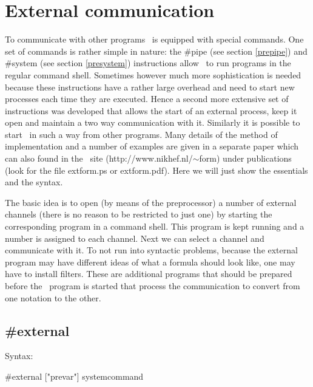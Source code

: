 \chapter{External communication}
\label{externalcommunication}

To communicate with other programs \FORM\ is 
equipped with special commands. One set of commands is rather simple in 
nature: the \#pipe (see section \ref{prepipe}) and 
\#system (see section \ref{presystem}) instructions allow 
\FORM\ to run programs in the regular command 
shell. Sometimes however much more sophistication is needed 
because these instructions have a rather large overhead and need to start 
new processes each time they are executed. Hence a second more extensive 
set of instructions was developed that allows the start of an external 
process, keep it open and maintain a two way 
communication with it. Similarly it is 
possible to start \FORM\ in such a way from other programs. Many details of 
the method of implementation and a number of examples are given in a 
separate paper which can also found in the \FORM\ site 
(http://www.nikhef.nl/$\sim$form) under publications (look for the file 
extform.ps or extform.pdf). Here we 
will just show the essentials and the syntax.

The basic idea is to open (by means of the preprocessor) a number of 
external channels (there is no reason to be 
restricted to just one) by starting the corresponding program in a command 
shell. This program is kept running and a number is assigned to each 
channel. Next we can select a channel and communicate with it. To not run 
into syntactic problems, because the external program may have different 
ideas of what a formula should look like, one may have to install 
filters. These are additional programs that should be 
prepared before the \FORM\ program is started that process the communication 
to convert from one notation to the other.


\section{\#external}
\label{external}

\noindent Syntax:

\#external ["prevar"] systemcommand

